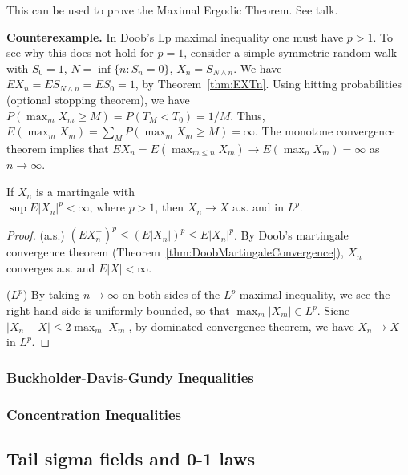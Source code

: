 \begin{remark}
    This can be used to prove the Maximal Ergodic Theorem. See talk.
\end{remark}

\textbf{Counterexample.} In Doob's Lp maximal inequality one must have $ p > 1$. To see why this does not hold for $p = 1$, consider a simple symmetric random walk with $S_0 = 1$, $N = \inf \{n: S_n = 0\}$, $X_n = S_{N \wedge n} $. We have $E X_n = E S_{N \wedge n} = E S_0 = 1$, by Theorem~\ref{thm:EXTn}. Using hitting probabilities (optional stopping theorem), we have $P(\max_m X_m \geq M)= P(T_M < T_0) = 1 / M$. Thus, $E(\max_m X_m) = \sum_M P(\max_m X_m \geq M) = \infty$. The monotone convergence theorem implies that $E \bar X_n = E (\max_{m \leq n} X_m) \to E (\max _n X_m) = \infty$ as $n \to \infty$.

\begin{theorem}
    If $X_n$ is a martingale with \\$\sup E |X_n|^p < \infty$, where $p > 1$, then $X_n \to X$ a.s. and in $L^p$.
\end{theorem}
\begin{proof}
    (a.s.) $(EX_n^+)^p \leq (E|X_n|)^p \leq E |X_n|^p$. By Doob's martingale convergence theorem (Theorem~\ref{thm:DoobMartingaleConvergence}), $X_n$ converges a.s. and $E|X| < \infty$.

    ($L^p$) By taking $n \to \infty$ on both sides of the $L^p$ maximal inequality, we see the right hand side is uniformly bounded, so that $\max_m |X_m| \in L^p$. Sicne $|X_n - X| \leq 2 \max_m |X_m|$, by dominated convergence theorem, we have $X_n \to X$ in $L^p$.
\end{proof}

\subsubsection{Buckholder-Davis-Gundy Inequalities}

\subsubsection{Concentration Inequalities}


\subsection{Tail sigma fields and 0-1 laws}

